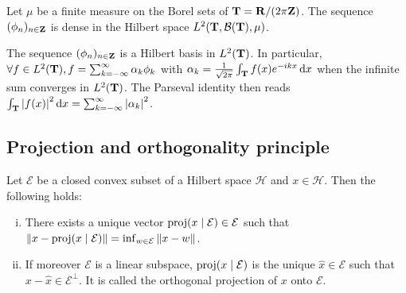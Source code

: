 	\begin{cor}
		Let $\mu$ be a finite measure on the Borel sets of $\mathbf{T} = \mathbf{R} / (2\pi\mathbf{Z})$.
		The sequence $(\phi_n)_{n \in \mathbf{Z}}$ is dense in the Hilbert space $L^2(\mathbf{T}, \mathcal{B}(\mathbf{T}), \mu)$.
	\end{cor}

	\begin{cor}
		The sequence $(\phi_n)_{n \in \mathbf{Z}}$ is a Hilbert basis in $L^2(\mathbf{T})$.
		In particular, $\forall f \in L^2(\mathbf{T}), f = \sum_{k = -\infty}^\infty \alpha_k \phi_k$ with $\alpha_k = \frac{1}{\sqrt{2\pi}} \int_{\mathbf{T}} f(x) e^{-ikx} \mathop{}\mathopen{}\mathrm{d} x$ when the infinite sum converges in $L^2(\mathbf{T})$.
		The Parseval identity then reads $\int_{\mathbf{T}} \left\lvert f(x)\right\rvert^2 \mathop{}\mathopen{}\mathrm{d} x = \sum_{k = -\infty}^\infty \left\lvert\alpha_k\right\rvert^2$.
	\end{cor}


\subsection*{Projection and orthogonality principle}

	\begin{thm}
		Let $\mathcal{E}$ be a closed convex subset of a Hilbert space $\mathcal{H}$ and $x \in \mathcal{H}$.
		Then the following holds:
		\begin{enumerate}[(i)]
			\item There exists a unique vector $\operatorname{proj}(x \mid \mathcal{E}) \in \mathcal{E}$ such that $\left\lVert x - \operatorname{proj}(x \mid \mathcal{E})\right\rVert = \inf_{w \in \mathcal{E}} \left\lVert x - w\right\rVert$.
			\item If moreover $\mathcal{E}$ is a linear subspace, $\operatorname{proj}(x \mid \mathcal{E})$ is the unique $\hat{x} \in \mathcal{E}$ such that $x - \hat{x} \in \mathcal{E}^\perp$. It is called the orthogonal projection of $x$ onto $\mathcal{E}$.
		\end{enumerate}
	\end{thm}

